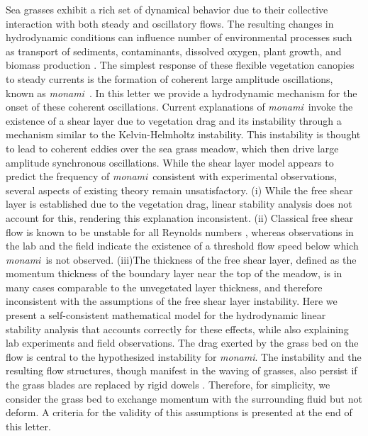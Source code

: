 \documentclass[aps,prl,twocolumn,superscriptaddress,10pt]{revtex4-1}  %
\newcommand{\monami}{\textit{monami}}
\begin{document}
\maketitle
Sea grasses exhibit a rich set of dynamical behavior due to their collective interaction with both steady and oscillatory flows.  
The resulting changes in hydrodynamic conditions can influence number of environmental processes such as transport of sediments, contaminants, dissolved oxygen, plant growth, and biomass production  \cite{Fonseca87,Grizzle96,Nepf99,Nepf2012}. 
The simplest response of these flexible vegetation canopies to steady currents is the formation of coherent large amplitude oscillations, known as \monami ~\cite{AckermanOkubo93}.  
In this letter we provide a hydrodynamic mechanism for the onset of these coherent oscillations.
\newline
Current explanations of \monami ~invoke the existence of a shear layer due to vegetation drag  \cite{Ghisal02,Raupach96} and its instability through a mechanism similar to the Kelvin-Helmholtz instability. 
This instability is thought to lead to coherent eddies over the sea grass meadow, which then drive large amplitude synchronous oscillations.
\newline
While the shear layer model appears to predict the frequency of \monami ~consistent with experimental observations, several aspects of existing theory remain unsatisfactory. 
(i) While the free shear layer is established due to the vegetation drag, linear stability analysis \cite{Raupach96} does not account for this, rendering this explanation inconsistent. 
(ii) Classical free shear flow is known to be unstable for all Reynolds numbers \cite{drazin}, whereas observations in the lab \cite{Ghisal02} and the field \cite{Grizzle96} indicate the existence of a threshold flow speed below which \monami ~is not observed. 
(iii)The thickness of the free shear layer, defined as the momentum thickness of the boundary layer near the top of the meadow, is in many cases comparable to the unvegetated layer thickness, and therefore inconsistent with the assumptions of the free shear layer instability.
Here we present a self-consistent mathematical model for the hydrodynamic linear stability analysis that accounts correctly for these effects, while also explaining lab experiments and field observations.
\newline
The drag exerted by the grass bed on the flow is central to the hypothesized instability for \monami. 
The instability and the resulting flow structures, though manifest in the waving of grasses, also persist if the grass blades are replaced by rigid dowels \cite{Ghisal02}. 
Therefore, for simplicity, we consider the grass bed to exchange momentum with the surrounding fluid but not deform. 
A criteria for the validity of this assumptions is presented at the end of this letter.
\end{document}
